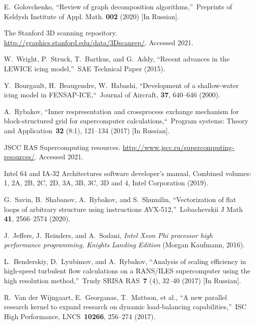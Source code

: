 \documentclass[
11pt,%
tightenlines,%
twoside,%
onecolumn,%
nofloats,%
nobibnotes,%
nofootinbib,%
superscriptaddress,%
noshowpacs,%
centertags]%
{revtex4}
\begin{document}
\begin{thebibliography}{99}

E.~Golovchenko, \textquotedblleft Review of graph decomposition algorithms,\textquotedblright \ Preprints of Keldysh Institute of Appl. Math. \textbf{002} (2020) [In Russian].

The Stanford 3D scanning repository. \url{http://graphics.stanford.edu/data/3Dscanrep/}. Accessed 2021.

W.~Wright, P.~Struck, T.~Bartkus, and G.~Addy, \textquotedblleft Recent advances in the LEWICE icing model,\textquotedblright \ SAE Technical Paper (2015).

Y.~Bourgault, H.~Beaugendre, W.~Habashi, \textquotedblleft Development of a shallow-water icing model in FENSAP-ICE,\textquotedblleft \ Journal of Aircraft, \textbf{37}, 640--646 (2000).


A.~Rybakov, \textquotedblleft Inner respresentation and crossprocess exchange mechanism for block-structured grid for supercomputer calculations,\textquotedblleft \  Program systems: Theory and Application~{\bf 32} (8:1), 121--134 (2017) [In Russian].


JSCC RAS Supercomputing resources. \url{http://www.jscc.ru/supercomputing-resources/}. Accessed 2021.

Intel 64 and IA-32 Architectures software developer's manual, Combined volumes: 1, 2A, 2B, 2C, 2D, 3A, 3B, 3C, 3D and 4, Intel Corporation (2019).

G.~Savin, B.~Shabanov, A.~Rybakov, and S.~Shumilin, \textquotedblleft Vectorization of flat loops of arbitrary structure using instructions AVX-512,\textquotedblright \ Lobachevskii J Math {\bf 41}, 2566--2574 (2020).

J.~Jeffers, J.~Reinders, and A.~Sodani, \emph{Intel Xeon Phi processor high performance programming, Knights Landing Edition} (Morgan Kaufmann, 2016).

L.~Benderskiy, D.~Lyubimov, and A.~Rybakov, \textquotedblleft Analysis of scaling efficiency in high-speed turbulent flow calculations on a RANS/ILES supercomputer using the high resolution method,\textquotedblright \ Trudy SRISA RAS~{\bf 7} (4), 32--40 (2017) [In Russian].

R.~Van der Wijngaart, E.~Georganas, T.~Mattson, et al., \textquotedblleft A new parallel research kernel to expand research on dynamic load-balancing capabilities,\textquotedblright \ ISC High Performance, LNCS~{\bf 10266}, 256--274 (2017).


\end{thebibliography}
\end{document}
